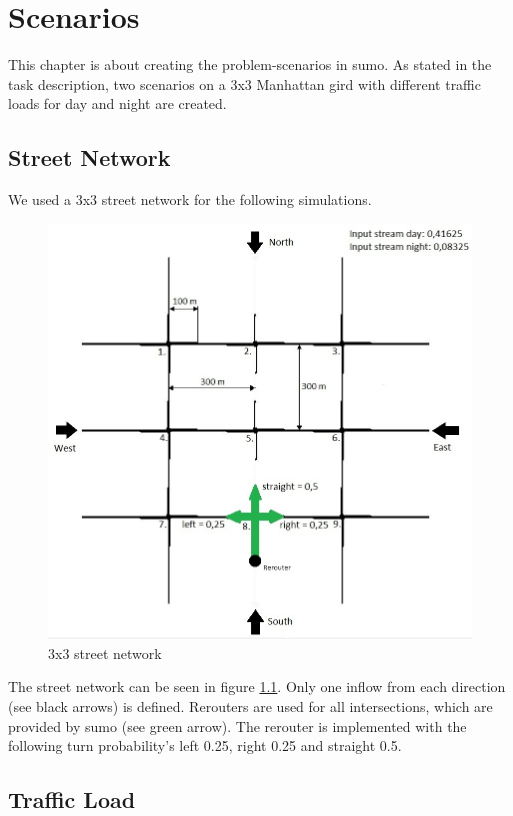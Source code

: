 \documentclass[./\jobname.tex]{subfiles}
\begin{document}
\newpage



\chapter{Scenarios}
This chapter is about creating the problem-scenarios in sumo. As stated in the task description, two scenarios on a 3x3 Manhattan gird with different traffic loads for day and night are created. 


\section{Street Network}

We used a 3x3 street network for the following simulations.

\begin{figure}[H]
	\centering
	\includegraphics[width=0.75\linewidth]{../img/jpg/3x3_inf.jpg}
	\caption{3x3 street network}
	\label{fig:3x3inf}
\end{figure}

The street network can be seen in figure \ref{fig:3x3inf}. Only one inflow from each direction (see black arrows) is defined. Rerouters are used for all intersections, which are provided by sumo (see green arrow). The rerouter is implemented with the following turn probability's left 0.25, right 0.25 and straight 0.5.



\section{Traffic Load}
\end{document}
